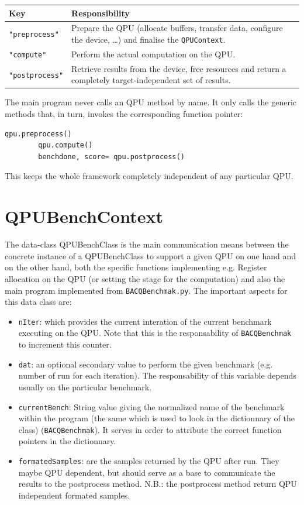 \begin{center}
\begin{tabular}{|l|p{9.5cm}|}
\hline
\textbf{Key} & \textbf{Responsibility} \\
\hline
\texttt{"preprocess"}  & Prepare the QPU (allocate buffers, transfer data, configure the device, \ldots) and finalise the \texttt{QPUContext}. \\
\hline
\texttt{"compute"}         & Perform the actual computation on the QPU. \\
\hline
\texttt{"postprocess"} & Retrieve results from the device, free resources and return a completely target-independent set of results. \\
\hline
\end{tabular}
\end{center}

The main program never calls an QPU method by name.  It only calls the generic methods that, in turn, invokes the corresponding function pointer:

\begin{lstlisting}[language=Python]
		qpu.preprocess()
		qpu.compute()
		benchdone, score= qpu.postprocess()
\end{lstlisting}

This keeps the whole framework completely independent of any particular QPU.


\section{QPUBenchContext}

The data-class QPUBenchClass is the main communication means between the concrete instance of a QPUBenchClass to support a given QPU on one hand and on the other hand, both the specific functions implementing e.g. Register allocation on the QPU (or setting the stage for the computation) and also the main program implemented from \texttt{BACQBenchmak.py}.
The important aspects for this data class are:
\begin{itemize}
	\item \texttt{nIter}: which provides the current interation of the current benchmark executing on the QPU. Note that this is the responsability of \texttt{BACQBenchmak} to increment this counter.
	\item \texttt{dat}: an optional secondary value to perform the given benchmark (e.g. number of run for each iteration). The responsability of this variable depends usually on the particular benchmark.
	\item \texttt{currentBench}: String value giving the normalized name of the benchmark within the program (the same which is used to look in the dictionnary of the class) (\texttt{BACQBenchmak}). It serves in order to attribute the correct function pointers in the dictionnary.
	\item \texttt{formatedSamples}: are the samples returned by the QPU after run. They maybe QPU dependent, but should serve as a base to communicate the results to the postprocess method. N.B.: the postprocess method return QPU independent formated samples.
\end{itemize}

